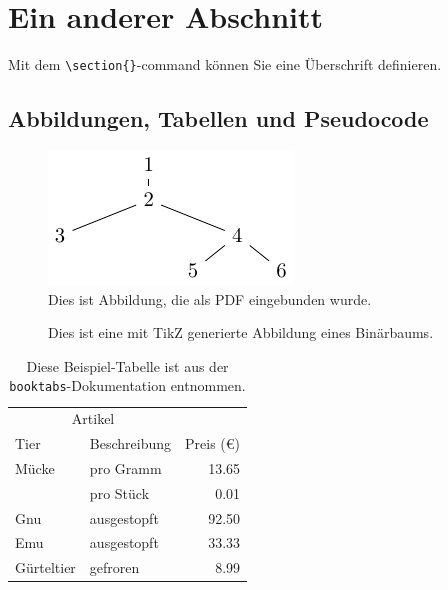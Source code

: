 \documentclass[a4paper,german]{tui-algo-seminar}
\begin{document}
\section{Ein anderer Abschnitt}

Mit dem \texttt{\textbackslash section\{\}}-command können Sie eine Überschrift definieren.

\subsection{Abbildungen, Tabellen und Pseudocode}

\begin{figure}[ht]
	\centering
	\includegraphics[scale = 0.7]{figures/figure-1.pdf}
	\caption{Dies ist Abbildung, die als PDF eingebunden wurde.}
	\label{fig:picture}
\end{figure}

\begin{figure}
	\centering
	\caption{Dies ist eine mit TikZ generierte Abbildung eines Binärbaums.}
	\label{fig:binary-tree}
\end{figure}

\begin{table}[ht]
\centering
\caption{Diese Beispiel-Tabelle ist aus der \texttt{booktabs}-Dokumentation entnommen.}
\begin{tabular}{llr}
	\toprule
	\multicolumn{2}{c}{Artikel} \\
	\cmidrule(r){1-2}
	Tier & Beschreibung & Preis (€) \\
	\midrule
	Mücke & pro Gramm & 13.65 \\
				& pro Stück & 0.01 \\
	Gnu   & ausgestopft & 92.50 \\
	Emu   & ausgestopft & 33.33 \\
	Gürteltier & gefroren & 8.99 \\
	\bottomrule
\end{tabular}
\label{tab:interessante-tabelle}
\end{table}
\end{document}
